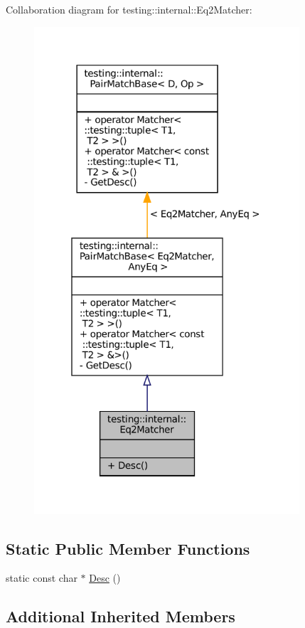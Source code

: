 Collaboration diagram for testing\+:\+:internal\+:\+:Eq2\+Matcher\+:
\nopagebreak
\begin{figure}[H]
\begin{center}
\leavevmode
\includegraphics[width=280pt]{classtesting_1_1internal_1_1Eq2Matcher__coll__graph}
\end{center}
\end{figure}
\subsection*{Static Public Member Functions}
\begin{DoxyCompactItemize}
\item 
static const char $\ast$ \hyperlink{classtesting_1_1internal_1_1Eq2Matcher_a87c049778ac3d124641b21e47ef558dc}{Desc} ()
\end{DoxyCompactItemize}
\subsection*{Additional Inherited Members}



